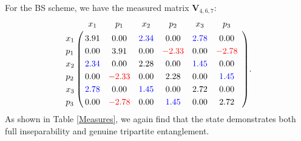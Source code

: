 \documentclass[prl,10pt,twocolumn,superscriptaddress,notitlepage,floatfix,amssymb]{revtex4}
\begin{document}



For the BS scheme, we have the measured matrix $\mathbf{V}_{4,6,7}$:
\begin{align*}
	\bordermatrix{
		& x_1  & p_1 & x_2  & p_2  & x_3  & p_3\ \\
    x_1 & 3.91&0.00&{\color{blue}2.34}&0.00&{\color{blue}2.78}&0.00\ \\
	p_1 & 0.00&3.91&0.00&{\color{red}-2.33}&0.00&{\color{red}-2.78}\ \\
	x_2 & {\color{blue}2.34}&0.00&2.28&0.00&{\color{blue}1.45}&0.00\ \\
	p_2 & 0.00&{\color{red}-2.33}&0.00&2.28&0.00&{\color{blue}1.45}\ \\
	x_3 & {\color{blue}2.78}&0.00&{\color{blue}1.45}&0.00&2.72&0.00\ \\
	p_3 & 0.00&{\color{red}-2.78}&0.00&{\color{blue}1.45}&0.00&2.72\ }.
\end{align*}
As shown in Table \ref{Measures}, we again find that the state demonstrates both full inseparability and genuine tripartite entanglement. %
\end{document}
